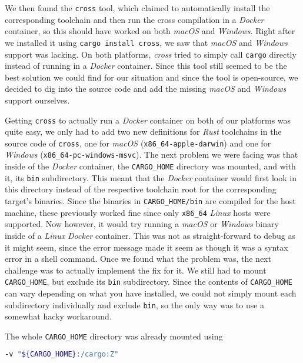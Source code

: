 We then found the \texttt{cross} \cite{cross} tool, which claimed to automatically install the
corresponding toolchain and then run the cross compilation in a \textit{Docker} container, so this
should have worked on both \textit{macOS} and \textit{Windows}. Right after we installed it using
\texttt{cargo install cross}, we saw that \textit{macOS} and \textit{Windows} support was lacking.
On both platforms, \textit{cross} tried to simply call \texttt{cargo} directly instead of running in a
\textit{Docker} container. Since this tool still seemed to be the best solution we could find for
our situation and since the tool is open-source, we decided to dig into the source code and add the
missing \textit{macOS} and \textit{Windows} support ourselves.

Getting \texttt{cross} to actually run a \textit{Docker} container on both of our platforms was quite easy,
we only had to add two new definitions for \textit{Rust} toolchains in the source code of
\texttt{cross}, one for \textit{macOS} (\texttt{x86\_64-apple-darwin}) and one for \textit{Windows}
(\texttt{x86\_64-pc-windows-msvc}). The next problem we were facing was that inside of the
\textit{Docker} container, the \texttt{CARGO\_HOME} directory was mounted, and with it, its
\texttt{bin} subdirectory. This meant that the \textit{Docker} container would first look in this
directory instead of the respective toolchain root for the corresponding target's binaries. Since
the binaries in \texttt{CARGO\_HOME/bin} are compiled for the host machine, these previously worked
fine since only \texttt{x86\_64} \textit{Linux} hosts were supported. Now however, it would try
running a \textit{macOS} or \textit{Windows} binary inside of a \textit{Linux} \textit{Docker}
container. This was not as straight-forward to debug as it might seem, since the error message made
it seem as though it was a syntax error in a shell command. Once we found what the problem was, the
next challenge was to actually implement the fix for it. We still had to mount \texttt{CARGO\_HOME},
but exclude its \texttt{bin} subdirectory. Since the contents of \texttt{CARGO\_HOME} can vary
depending on what you have installed, we could not simply mount each subdirectory individually and
exclude \texttt{bin}, so the only way was to use a somewhat hacky workaround.

The whole \texttt{CARGO\_HOME} directory was already mounted using

\begin{lstlisting}[language=Bash]
-v "${CARGO_HOME}:/cargo:Z"
\end{lstlisting}

